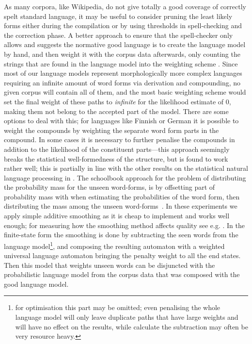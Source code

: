 \documentclass[a4paper,12pt]{article}
\begin{document}
As many corpora, like Wikipedia, do not give totally a good coverage of
correctly spelt standard language, it may be useful to consider pruning the
least likely forms either during the compilation or by using thresholds in
spell-checking and the correction phase. A better approach to ensure that the
spell-checker only allows and suggests the normative good language is to create
the language model by hand, and then weight it with the corpus data afterwards,
only counting the strings that are found in the language model into the
weighting scheme \cite[]{pirinen/2009/nodalida}. Since most of our language
models represent morphologically more complex languages requiring an infinite
amount of word forms via derivation and compounding, no given corpus will
contain all of them, and the most basic weighting scheme would set the final
weight of these paths to \emph{infinite} for the likelihood estimate of 0,
making them not belong to the accepted part of the model. There are some
options to deal with this; for languages like Finnish or German
\cite[]{schiller2006german} it is possible to weight the compounds by weighting
the separate word form parts in the compound.  In some cases it is necessary to
further penalise the compounds in addition to the likelihood of the constituent
parts---this approach seemingly breaks the statistical well-formedness of the
structure, but is found to work rather well; this is partially in line with the
other results on the statistical natural language processing in
\cite{brants2007large}. The schoolbook approach for the problem of distributing
the probability mass for the unseen word-forms, is by offsetting part of
probability mass with when estimating the probabilities of the word form, then
distributing the mass among the unseen word-forms~\cite[for a good introduction
to smoothing models we refer to][]{jurafsky2000speech}. In these experiments we
apply simple additive smoothing as it is cheap to implement and works well
enough; for measuring how the smoothing method affects quality see e.g.
\cite{chen1999empirical}. In the finite-state form the smoothing is done by
subtracting the seen words from the language model\footnote{for optimisation
    this part may be omitted; even penalising the whole language model will
    only leave duplicate paths that have large weights and will have no effect
on the results, while calculate the subtraction may often be very resource
heavy.}, and composing the resulting automaton with a weighted universal
language automaton bringing the penalty weight to all the end states.  Then
this model that weights unseen words can be disjuncted with the probabilistic
language model from the corpus data that was composed with the good language
model.
\end{document}
